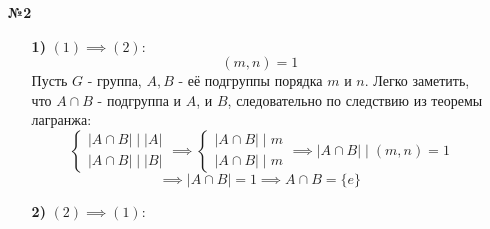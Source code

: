 \documentclass[a4paper]{article}
\newcommand{\case}[1]{\begin{cases} #1 \end{cases}}
\newcommand{\divides}{\;|\;}
\begin{document}
\begin{enumerate}
    \item[\textbf{№2}]\begin{enumerate}
        \item[\textbf{1)}] $(1) \implies (2):$\\
        $$(m, n) = 1$$
        Пусть $G$ - группа, $A, B$ - её подгруппы порядка $m$ и $n$. Легко заметить, что $A \cap B$ - подгруппа и $A$, и $B$, следовательно по следствию из теоремы лагранжа:
        $$\case{|A\cap B| \divides |A|\\
        |A\cap B| \divides |B|} \implies \case{|A\cap B| \divides m\\
        |A\cap B| \divides m} \implies |A\cap B| \divides (m, n) = 1 $$
        $$\implies |A\cap B| = 1 \implies A \cap B = \{e\}$$

        \item[\textbf{2)}] $(2) \implies (1):$\\
        


    \end{enumerate}

\end{enumerate}
\end{document}
